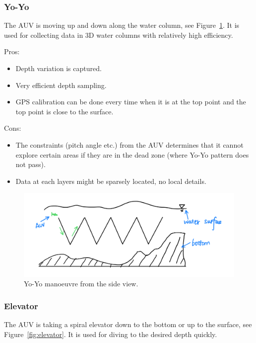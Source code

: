 \documentclass[a4paper,12pt]{report}
\begin{document}
\subsubsection*{Yo-Yo}
The AUV is moving up and down along the water column, see Figure~\ref{fig:yoyo}. It is used for collecting data in 3D water columns with relatively high efficiency. 

Pros:
\begin{itemize}
    \item Depth variation is captured. 
    \item Very efficient depth sampling.
    \item GPS calibration can be done every time when it is at the top point and the top point is close to the surface. 
\end{itemize}

Cons:
\begin{itemize}
    \item The constraints (pitch angle etc.) from the AUV determines that it cannot explore certain areas if they are in the dead zone (where Yo-Yo pattern does not pass).
    \item Data at each layers might be sparsely located, no local details. 
\end{itemize}


\begin{figure}
    \centering
    \includegraphics[width = \textwidth]{fig/yoyo.png}
    \caption{Yo-Yo manoeuvre from the side view.}
    \label{fig:yoyo}
\end{figure}

\subsubsection*{Elevator}

The AUV is taking a spiral elevator down to the bottom or up to the surface, see Figure~\ref{fig:elevator}. It is used for diving to the desired depth quickly. 
\end{document}
